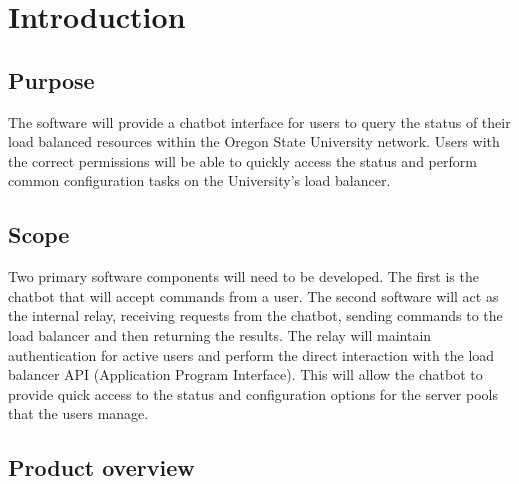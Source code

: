 \documentclass[onecolumn, draftclsnofoot,10pt, compsoc]{IEEEtran}
\begin{document}
\clearpage

\section{Introduction}
\subsection{Purpose}
 The software will provide a chatbot interface for users to query the status of their load balanced resources within the Oregon State University network.
 Users with the correct permissions will be able to quickly access the status and perform common configuration tasks on the University's load balancer.
 
\subsection{Scope}
Two primary software components will need to be developed.
The first is the chatbot that will accept commands from a user.
The second software will act as the internal relay, receiving requests from the chatbot, sending commands to the load balancer and then returning the results.
The relay will maintain authentication for active users and perform the direct interaction with the load balancer API (Application Program Interface).
This will allow the chatbot to provide quick access to the status and configuration options for the server pools that the users manage.

\subsection{Product overview}
\end{document}
